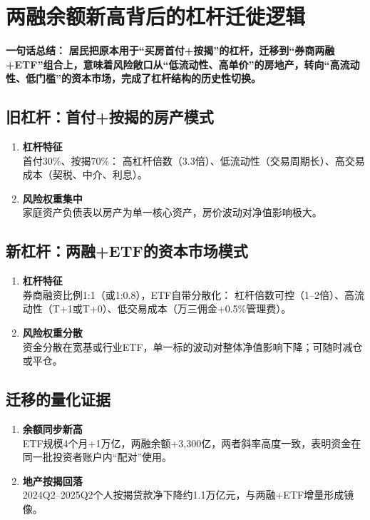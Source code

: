 {\color{red}\section{两融余额新高背后的杠杆迁徙逻辑}}
\textbf{一句话总结：}  
{\color{red}\textbf{居民把原本用于“买房首付+按揭”的杠杆，迁移到“券商两融+ETF”组合上，意味着风险敞口从“低流动性、高单价”的房地产，转向“高流动性、低门槛”的资本市场，完成了杠杆结构的历史性切换。}}

\subsection{旧杠杆：首付+按揭的房产模式}
\begin{enumerate}[leftmargin=*, nosep]
    \item \textbf{杠杆特征}  \\
    首付30\%、按揭70\%：  
    高杠杆倍数（3.3倍）、低流动性（交易周期长）、高交易成本（契税、中介、利息）。
    \item \textbf{风险权重集中}  \\
    家庭资产负债表以房产为单一核心资产，房价波动对净值影响极大。
\end{enumerate}

\subsection{新杠杆：两融+ETF的资本市场模式}
\begin{enumerate}[leftmargin=*, nosep]
    \item \textbf{杠杆特征}  \\
    券商融资比例1:1（或1:0.8），ETF自带分散化：  
    杠杆倍数可控（1–2倍）、高流动性（T+1或T+0）、低交易成本（万三佣金+0.5\%管理费）。
    \item \textbf{风险权重分散}  \\
    资金分散在宽基或行业ETF，单一标的波动对整体净值影响下降；可随时减仓或平仓。
\end{enumerate}

\subsection{迁移的量化证据}
\begin{enumerate}[leftmargin=*, nosep]
    \item \textbf{余额同步新高}  \\
    ETF规模4个月+1万亿，两融余额+3,300亿，两者斜率高度一致，表明资金在同一批投资者账户内“配对”使用。
    \item \textbf{地产按揭回落}  \\
    2024Q2–2025Q2个人按揭贷款净下降约1.1万亿元，与两融+ETF增量形成镜像。
\end{enumerate}

